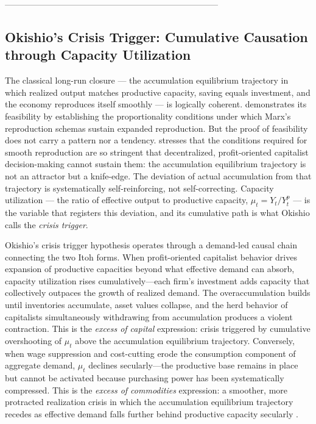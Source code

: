 \documentclass[11pt,a4paper]{article}
\begin{document}
 ---------------------------------------------------------------------------
\subsection{Okishio's Crisis Trigger: Cumulative Causation through Capacity Utilization}
\label{sec:okishio}

The classical long-run closure --- the accumulation equilibrium trajectory 
in which realized output matches productive capacity, saving equals 
investment, and the economy reproduces itself smoothly --- is logically 
coherent. \citet{Basu2019} demonstrates its feasibility by establishing 
the proportionality conditions under which Marx's reproduction schemas 
sustain expanded reproduction. But the proof of feasibility does not carry a pattern nor a tendency. \citet{Okishio2022} stresses that the conditions required for smooth  reproduction are so stringent that decentralized, profit-oriented  capitalist decision-making cannot sustain them: the accumulation  equilibrium trajectory is not an attractor but a knife-edge. The 
deviation of actual accumulation from that trajectory is systematically 
self-reinforcing, not self-correcting. Capacity utilization --- the ratio 
of effective output to productive capacity, $\mu_t = Y_t / Y_t^p$ --- is 
the variable that registers this deviation, and its cumulative path is 
what Okishio calls the \textit{crisis trigger}.

Okishio's crisis trigger hypothesis operates through a demand-led causal chain connecting the two Itoh forms. When profit-oriented capitalist behavior drives expansion of productive capacities beyond what effective demand can absorb, capacity utilization rises cumulatively---each firm's investment adds capacity that collectively outpaces the growth of realized demand. The overaccumulation builds until inventories accumulate, asset values collapse, and the herd behavior of capitalists simultaneously withdrawing from accumulation produces a violent contraction. This is the \textit{excess of capital} expression: crisis triggered by cumulative overshooting of $\mu_t$ above the accumulation equilibrium trajectory. Conversely, when wage suppression and cost-cutting erode the consumption component of aggregate demand, $\mu_t$ declines secularly---the productive base remains in place but cannot be activated because purchasing power has been systematically compressed. This is the \textit{excess of commodities} expression: a smoother, more protracted realization crisis in which the accumulation equilibrium trajectory recedes as effective demand falls further behind productive capacity secularly \citep{Okishio2022, Itoh1978}.
\end{document}
